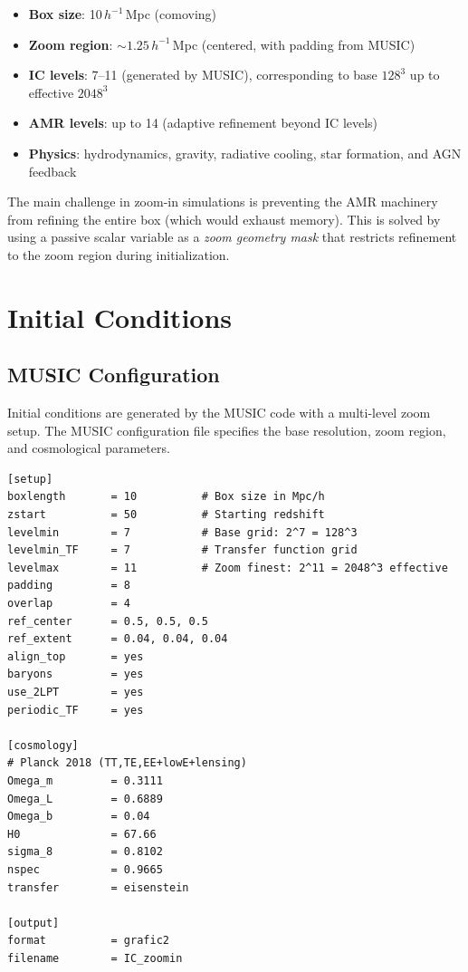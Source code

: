 \documentclass[11pt,fleqn]{book}
\begin{document}
\begin{itemize}[leftmargin=2em]
  \item \textbf{Box size}: 10\,$h^{-1}$\,Mpc (comoving)
  \item \textbf{Zoom region}: ${\sim}1.25$\,$h^{-1}$\,Mpc (centered, with padding from MUSIC)
  \item \textbf{IC levels}: 7--11 (generated by MUSIC), corresponding to base $128^3$ up to effective $2048^3$
  \item \textbf{AMR levels}: up to 14 (adaptive refinement beyond IC levels)
  \item \textbf{Physics}: hydrodynamics, gravity, radiative cooling, star formation, and AGN feedback
\end{itemize}

The main challenge in zoom-in simulations is preventing the AMR machinery from refining the entire box (which would exhaust memory). This is solved by using a passive scalar variable as a \emph{zoom geometry mask} that restricts refinement to the zoom region during initialization.


\section{Initial Conditions}

\subsection{MUSIC Configuration}

Initial conditions are generated by the MUSIC code with a multi-level zoom setup. The MUSIC configuration file specifies the base resolution, zoom region, and cosmological parameters.

\begin{codebox}
\begin{lstlisting}[style=bash,numbers=none]
[setup]
boxlength       = 10          # Box size in Mpc/h
zstart          = 50          # Starting redshift
levelmin        = 7           # Base grid: 2^7 = 128^3
levelmin_TF     = 7           # Transfer function grid
levelmax        = 11          # Zoom finest: 2^11 = 2048^3 effective
padding         = 8
overlap         = 4
ref_center      = 0.5, 0.5, 0.5
ref_extent      = 0.04, 0.04, 0.04
align_top       = yes
baryons         = yes
use_2LPT        = yes
periodic_TF     = yes

[cosmology]
# Planck 2018 (TT,TE,EE+lowE+lensing)
Omega_m         = 0.3111
Omega_L         = 0.6889
Omega_b         = 0.04
H0              = 67.66
sigma_8         = 0.8102
nspec           = 0.9665
transfer        = eisenstein

[output]
format          = grafic2
filename        = IC_zoomin
\end{lstlisting}
\end{codebox}
\end{document}
